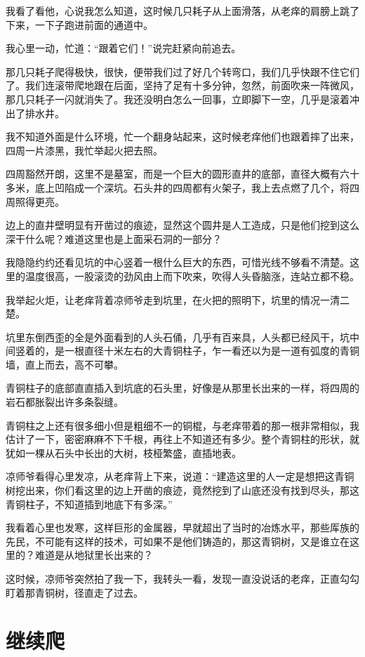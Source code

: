 我看了看他，心说我怎么知道，这时候几只耗子从上面滑落，从老痒的肩膀上跳了下来，一下子跑进前面的通道中。

我心里一动，忙道：“跟着它们！”说完赶紧向前追去。

那几只耗子爬得极快，很快，便带我们过了好几个转弯口，我们几乎快跟不住它们了。我们连滚带爬地跟在后面，坚持了足有十多分钟，忽然，前面吹来一阵微风，那几只耗子一闪就消失了。我还没明白怎么一回事，立即脚下一空，几乎是滚着冲出了排水井。

我不知道外面是什么环境，忙一个翻身站起来，这时候老痒他们也跟着摔了出来，四周一片漆黑，我忙举起火把去照。

四周豁然开朗，这里不是墓室，而是一个巨大的圆形直井的底部，直径大概有六十多米，底上凹陷成一个深坑。石头井的四周都有火架子，我上去点燃了几个，将四周照得更亮。

边上的直井壁明显有开凿过的痕迹，显然这个圆井是人工造成，只是他们挖到这么深干什么呢？难道这里也是上面采石洞的一部分？

我隐隐约约还看见坑的中心竖着一根什么巨大的东西，可惜光线不够看不清楚。这里的温度很高，一股滚烫的劲风由上而下吹来，吹得人头昏脑涨，连站立都不稳。

我举起火炬，让老痒背着凉师爷走到坑里，在火把的照明下，坑里的情况一清二楚。

坑里东倒西歪的全是外面看到的人头石俑，几乎有百来具，人头都已经风干，坑中间竖着的，是一根直径十米左右的大青铜柱子，乍一看还以为是一道有弧度的青铜墙，直上而去，高不可攀。

青铜柱子的底部直直插入到坑底的石头里，好像是从那里长出来的一样，将四周的岩石都胀裂出许多条裂缝。

青铜柱之上还有很多细小但是粗细不一的铜棍，与老痒带着的那一根非常相似，我估计了一下，密密麻麻不下千根，再往上不知道还有多少。整个青铜柱的形状，就犹如一棵从石头中长出的大树，枝桠繁盛，直插地表。

凉师爷看得心里发凉，从老痒背上下来，说道：“建造这里的人一定是想把这青铜树挖出来，你们看这里的边上开凿的痕迹，竟然挖到了山底还没有找到尽头，那这青铜柱子，不知道插到地底下有多深。”

我看着心里也发寒，这样巨形的金属器，早就超出了当时的冶炼水平，那些厍族的先民，不可能有这样的技术，可如果不是他们铸造的，那这青铜树，又是谁立在这里的？难道是从地狱里长出来的？

这时候，凉师爷突然拍了我一下，我转头一看，发现一直没说话的老痒，正直勾勾盯着那青铜树，径直走了过去。

\chapter{继续爬}

